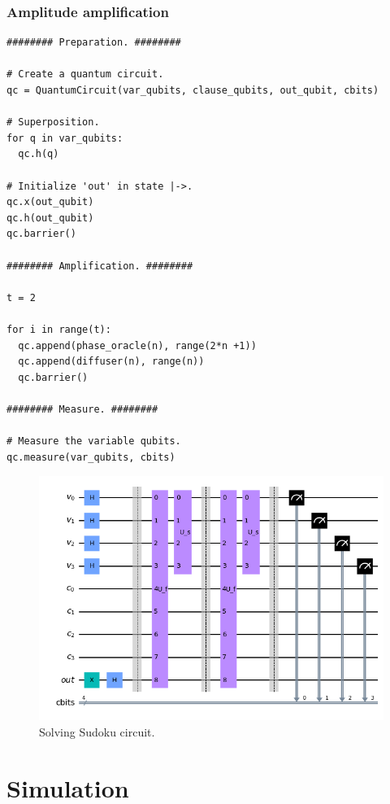 \documentclass{article}
\begin{document}
\subsubsection{Amplitude amplification}
\begin{verbatim}
######## Preparation. ########

# Create a quantum circuit.
qc = QuantumCircuit(var_qubits, clause_qubits, out_qubit, cbits)

# Superposition.
for q in var_qubits:
  qc.h(q)

# Initialize 'out' in state |->.
qc.x(out_qubit)
qc.h(out_qubit)
qc.barrier()

######## Amplification. ########

t = 2

for i in range(t):
  qc.append(phase_oracle(n), range(2*n +1))
  qc.append(diffuser(n), range(n))
  qc.barrier()

######## Measure. ########

# Measure the variable qubits.
qc.measure(var_qubits, cbits)
\end{verbatim}
\begin{figure}[H]
  \centering
  \includegraphics[width=345pt]{Img/circuit.png}
  \caption{Solving Sudoku circuit.}
\end{figure}


\section{Simulation}
\end{document}
